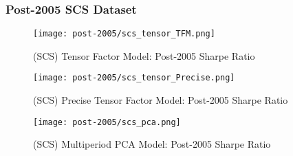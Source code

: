 \subsubsection{Post-2005 SCS Dataset}

\begin{figure}[H]
    \centering
    \texttt{[image: post-2005/scs\_tensor\_TFM.png]}
    \caption{(SCS) Tensor Factor Model: Post-2005 Sharpe Ratio}
    \label{fig:scs-post-2005-tfm}
\end{figure}

\begin{figure}[H]
    \centering
    \texttt{[image: post-2005/scs\_tensor\_Precise.png]}
    \caption{(SCS) Precise Tensor Factor Model: Post-2005 Sharpe Ratio}
    \label{fig:scs-post-2005-precise}
\end{figure}


\begin{figure}[H]
    \centering
    \texttt{[image: post-2005/scs\_pca.png]}
    \caption{(SCS) Multiperiod PCA Model: Post-2005 Sharpe Ratio}
    \label{fig:scs-post-2005-pca}
\end{figure}
